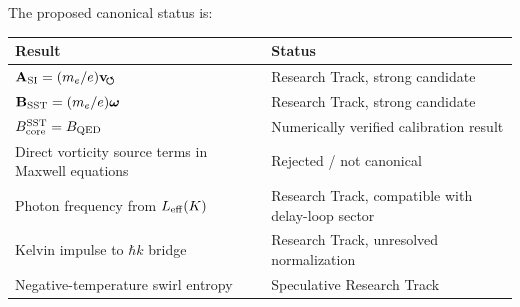 The proposed canonical status is:

\begin{center}
    \begin{tabular}{ll}
        \hline
        Result & Status \\
        \hline
        \(\mathbf{A}_{\rm SI}=(m_e/e)\mathbf{v}_{\!\boldsymbol{\circlearrowleft}}\) & Research Track, strong candidate \\
        \(\mathbf{B}_{\rm SST}=(m_e/e)\boldsymbol{\omega}\) & Research Track, strong candidate \\
        \(B_{\rm core}^{\rm SST}=B_{\rm QED}\) & Numerically verified calibration result \\
        Direct vorticity source terms in Maxwell equations & Rejected / not canonical \\
        Photon frequency from \(L_{\rm eff}(K)\) & Research Track, compatible with delay-loop sector \\
        Kelvin impulse to \(\hbar k\) bridge & Research Track, unresolved normalization \\
        Negative-temperature swirl entropy & Speculative Research Track \\
        \hline
    \end{tabular}
\end{center}